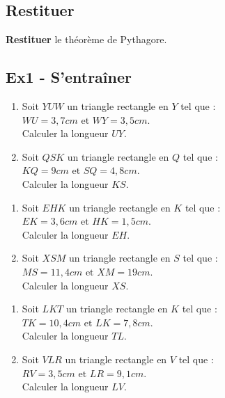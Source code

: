 \documentclass[12pt]{article}
\begin{document}
\subsection*{Restituer}

\textbf{Restituer} le théorème de Pythagore.

\subsection*{Ex1 - S'entraîner}

\begin{multicols}{2}
    \begin{enumerate}
    \item[1.] Soit $YUW$ un triangle rectangle en $Y$ tel que :\\
      $WU= 3,7cm \text{ et }WY= 3,5cm$.\\
      Calculer la longueur $UY$.
      \columnbreak
    \item[2.] Soit $QSK$ un triangle rectangle en $Q$ tel que :\\
      $KQ= 9cm \text{ et }SQ= 4,8cm$.\\
      Calculer la longueur $KS$.
    \end{enumerate}
  \end{multicols}


  \begin{multicols}{2}
    \begin{enumerate}
    \item[3.] Soit $EHK$ un triangle rectangle en $K$ tel que :\\
      $EK= 3,6cm \text{ et }HK= 1,5cm$.\\
      Calculer la longueur $EH$.
      \columnbreak
    \item[4.] Soit $XSM$ un triangle rectangle en $S$ tel que :\\
      $MS= 11,4cm \text{ et }XM= 19cm$.\\
      Calculer la longueur $XS$.
    \end{enumerate}
  \end{multicols}



  \begin{multicols}{2}
    \begin{enumerate}
    \item[5.] Soit $LKT$ un triangle rectangle en $K$ tel que :\\
      $TK= 10,4cm \text{ et }LK= 7,8cm$.\\
      Calculer la longueur $TL$.
      \columnbreak
    \item[6.] Soit $VLR$ un triangle rectangle en $V$ tel que :\\
      $RV= 3,5cm \text{ et }LR= 9,1cm$.\\
      Calculer la longueur $LV$.
    \end{enumerate}
  \end{multicols}
\end{document}
